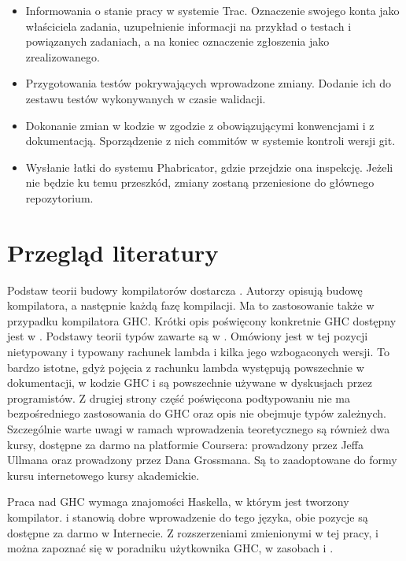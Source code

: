 \begin{itemize}
  \item Informowania o stanie pracy w systemie Trac. Oznaczenie swojego konta jako właściciela zadania, uzupełnienie informacji na przykład o testach i powiązanych zadaniach, a na koniec oznaczenie zgłoszenia jako zrealizowanego.
  \item Przygotowania testów pokrywających wprowadzone zmiany. Dodanie ich do zestawu testów wykonywanych w czasie walidacji.
  \item Dokonanie zmian w kodzie w zgodzie z obowiązującymi konwencjami i z dokumentacją. Sporządzenie z nich commitów w systemie kontroli wersji git.
  \item Wysłanie łatki do systemu Phabricator, gdzie przejdzie ona inspekcję. Jeżeli nie będzie ku temu przeszkód, zmiany zostaną przeniesione do głównego repozytorium.
\end{itemize}

\section{Przegląd literatury}\label{sec:przeglad_literatury}

Podstaw teorii budowy kompilatorów dostarcza \cite{Dragon}. Autorzy opisują
budowę kompilatora, a następnie każdą fazę kompilacji. Ma to zastosowanie także
w przypadku kompilatora GHC. Krótki opis poświęcony konkretnie GHC dostępny jest
w \cite{AOSA}. Podstawy teorii typów zawarte są w \cite{TAPL}. Omówiony jest w
tej pozycji nietypowany i typowany rachunek lambda i kilka jego wzbogaconych
wersji. To bardzo istotne, gdyż pojęcia z rachunku lambda występują powszechnie
w dokumentacji, w kodzie GHC i są powszechnie używane w dyskusjach przez
programistów. Z drugiej strony część poświęcona podtypowaniu nie ma
bezpośredniego zastosowania do GHC oraz opis nie obejmuje typów
zależnych. Szczególnie warte uwagi w ramach wprowadzenia teoretycznego są
również dwa kursy, dostępne za darmo na platformie Coursera: 
prowadzony przez Jeffa Ullmana oraz  prowadzony
przez Dana Grossmana. Są to zaadoptowane do formy kursu internetowego kursy
akademickie.

Praca nad GHC wymaga znajomości Haskella, w którym jest tworzony
kompilator. \cite{LearnYouAHaskell} i \cite{RealWorldHaskell} stanowią dobre
wprowadzenie do tego języka, obie pozycje są dostępne za darmo w Internecie. Z
rozszerzeniami zmienionymi w tej pracy,  i
 można zapoznać się w poradniku użytkownika GHC, w
zasobach \cite{GuideTypeFamilies} i \cite{GuidePartialTypeSignatures}.


